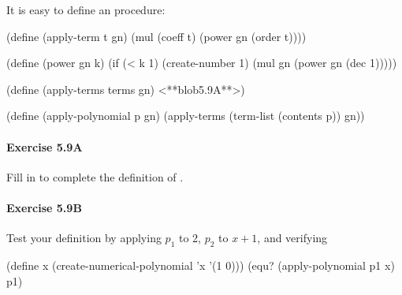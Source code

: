 It is easy to define an  procedure:

\beginlisp
(define (apply-term t gn)
  (mul (coeff t)
       (power gn (order t))))
\endlisp

\beginlisp
(define (power gn k)
  (if (< k 1)
      (create-number 1)
      (mul gn (power gn (dec 1)))))
\endlisp

\beginlisp
(define (apply-terms terms gn)
  <**blob5.9A**>)
\endlisp

\beginlisp
(define (apply-polynomial p gn)
  (apply-terms
   (term-list (contents p))
   gn))
\endlisp

\paragraph{Exercise 5.9A}
Fill in   to complete the definition of .

\paragraph{Exercise 5.9B}
Test your definition by applying $p_1$ to 2, $p_2$ to $x+1$, and verifying

\beginlisp
(define x (create-numerical-polynomial 'x '(1 0)))
(equ? (apply-polynomial p1 x) p1)
\endlisp



